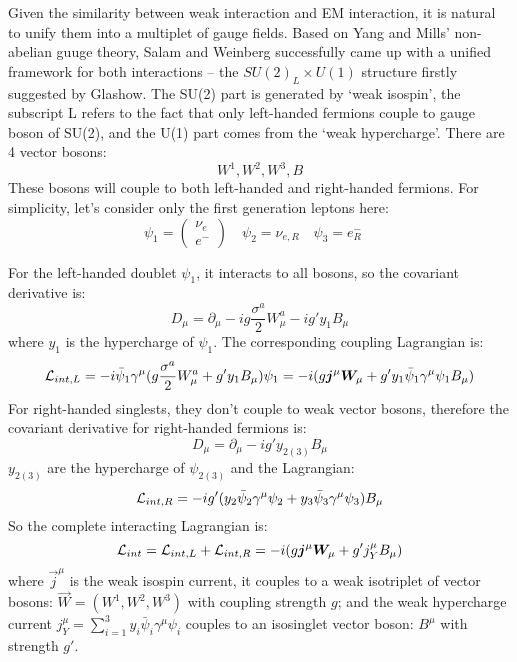 Given the similarity between weak interaction and EM interaction, it is natural
to unify them into a multiplet of gauge fields. Based on Yang and Mills' non-abelian 
guuge theory, Salam and Weinberg successfully came up with a unified 
framework for both interactions -- the $SU(2)_L \times U(1)$ structure firstly suggested 
by Glashow. The SU(2) part is generated by `weak isospin', the subscript L refers
to the fact that only left-handed fermions couple to gauge boson of SU(2), and the U(1)
part comes from the `weak hypercharge'. There are 4 vector bosons:
$$ W^1, W^2, W^3, B $$
These bosons will couple to both left-handed and right-handed fermions. For simplicity,
let's consider only the first generation leptons here:
\begin{equation}
    \psi_1 = \begin{pmatrix} \nu_e \\ e^-  \end{pmatrix}	\quad
    \psi_2 = \nu_{e,R}	\quad
    \psi_3 = e^-_R    \quad
\end{equation}

For the left-handed doublet $\psi_1$, it interacts to all bosons, 
so the covariant derivative is:
\begin{equation}
    D_\mu = \partial_\mu - ig\frac{\sigma^a}{2}W_\mu^a - ig'y_1B_\mu
\end{equation}
where $y_1$ is the hypercharge of $\psi_1$.
The corresponding coupling Lagrangian is:
\begin{equation}
    \mathcal{L}_{int, L} = -i\bar{\psi}_1 \gamma^\mu (g\frac{\sigma^a}{2}W^a_\mu + g'y_1B_\mu) \psi_1
	= -i(g\boldsymbol{j}^\mu\boldsymbol{W}_\mu + g'y_1\bar{\psi}_1\gamma^\mu\psi_1 B_\mu)
\end{equation}
For right-handed singlests, they don't couple to weak vector bosons, 
therefore the covariant derivative for right-handed fermions is:
\begin{equation}
    D_\mu = \partial_\mu - ig'y_{2(3)}B_\mu
\end{equation}
$y_{2(3)}$ are the hypercharge of $\psi_{2(3)}$
and the Lagrangian:
\begin{equation}
    \mathcal{L}_{int, R} = -ig'(y_2\bar{\psi}_2 \gamma^\mu \psi_2 + y_3\bar{\psi}_3\gamma^\mu \psi_3) B_\mu
\end{equation}
So the complete interacting Lagrangian is:
\begin{equation}
    \mathcal{L}_{int} = \mathcal{L}_{int, L} + \mathcal{L}_{int, R} = -i(g\boldsymbol{j}^\mu \boldsymbol{W}_\mu + g'j^\mu_{Y} B_\mu)
    \label{eqn:GSW}
\end{equation}
where $\vec{j}^\mu$ is the weak isospin current, it couples to a weak 
isotriplet of vector bosons: $\vec{W} = (W^1, W^2, W^3)$ with
coupling strength $g$; and the weak hypercharge current 
$j^\mu_{Y} = \sum_{i=1}^3 y_i\bar{\psi}_i\gamma^\mu\psi_i$ couples to 
an isosinglet vector boson: $B^\mu$ with strength $g'$. 

